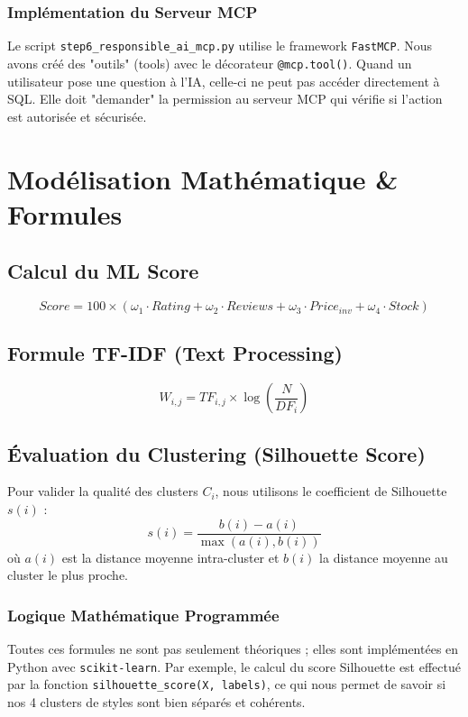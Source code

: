\documentclass[11pt,a4paper,oneside]{report}
\begin{document}
    \subsection{Implémentation du Serveur MCP}
    Le script \texttt{step6\_responsible\_ai\_mcp.py} utilise le framework \texttt{FastMCP}. Nous avons créé des "outils" (tools) avec le décorateur \texttt{@mcp.tool()}. Quand un utilisateur pose une question à l'IA, celle-ci ne peut pas accéder directement à SQL. Elle doit "demander" la permission au serveur MCP qui vérifie si l'action est autorisée et sécurisée.

    \chapter{Modélisation Mathématique & Formules}
    \section{Calcul du ML Score}
    \begin{equation}
        Score = 100 \times \left( \omega_1 \cdot Rating + \omega_2 \cdot Reviews + \omega_3 \cdot Price_{inv} + \omega_4 \cdot Stock \right)
    \end{equation}

    \section{Formule TF-IDF (Text Processing)}
    \begin{equation}
        W_{i,j} = TF_{i,j} \times \log \left( \frac{N}{DF_i} \right)
    \end{equation}

    \section{Évaluation du Clustering (Silhouette Score)}
    Pour valider la qualité des clusters $C_i$, nous utilisons le coefficient de Silhouette $s(i)$ :
    \begin{equation}
        s(i) = \frac{b(i) - a(i)}{\max(a(i), b(i))}
    \end{equation}
    où $a(i)$ est la distance moyenne intra-cluster et $b(i)$ la distance moyenne au cluster le plus proche.

    \subsection{Logique Mathématique Programmée}
    Toutes ces formules ne sont pas seulement théoriques ; elles sont implémentées en Python avec \texttt{scikit-learn}. Par exemple, le calcul du score Silhouette est effectué par la fonction \texttt{silhouette\_score(X, labels)}, ce qui nous permet de savoir si nos 4 clusters de styles sont bien séparés et cohérents.
\end{document}
